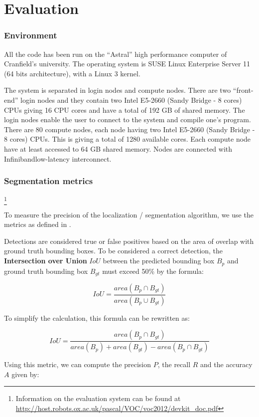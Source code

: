 \chapter{Evaluation}

\subsection{Environment}

All the code has been run on the \enquote{Astral} high performance computer of Cranfield's university. The operating system is SUSE Linux Enterprise Server 11 (64 bits architecture), with a Linux 3 kernel.

The system is separated in login nodes and compute nodes. There are two \enquote{front-end} login nodes and they contain two Intel E5-2660 (Sandy Bridge - 8 cores) CPUs giving 16 CPU cores and have a total of 192 GB of shared memory. The login nodes enable the user to connect to the system and compile one's program. There are 80 compute nodes, each node having two Intel E5-2660 (Sandy Bridge - 8 cores) CPUs. This is giving a total of 1280 available cores. Each compute node have at least accessed to 64 GB shared memory. Nodes are connected with Infiniband\TM low-latency interconnect.

\subsection{Segmentation metrics}

\footnote{Information on the evaluation system can be found at  \url{http://host.robots.ox.ac.uk/pascal/VOC/voc2012/devkit_doc.pdf}}

To measure the precision of the localization / segmentation algorithm, we use the metrics as defined in \cite{pascalVoc2012}.

Detections are considered true or false positives based on the area of overlap with ground truth bounding boxes. To be considered a correct detection, the \textbf{Intersection over Union} $IoU$ between the predicted bounding box $B_p$ and ground truth bounding box $B_{gt}$ must exceed 50\% by the formula:

$$IoU = \frac{area(B_p \cap B_{gt})}{area(B_p \cup B_{gt})}$$

To simplify the calculation, this formula can be rewritten as:

$$IoU = \frac{area(B_p \cap B_{gt})}{area(B_p) + area(B_{gt}) - area(B_p \cap B_{gt})} $$

Using this metric, we can compute the precision $P$, the recall $R$ and the accuracy $A$ given by:

